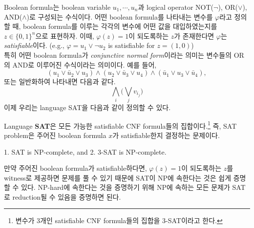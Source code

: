 Boolean formula는 boolean variable $u_1, \cdots, u_n$과 logical operator NOT($\neg$), OR($\vee$), AND($\wedge$)로 구성되는 수식이다. 어떤 boolean formula를 나타내는 변수를 $\varphi$라고 정의할 때, boolean formula를 이루는 각각의 변수에 어떤 값을 대입하였는지를 $z \in \{0, 1\}^n$으로 표현하자. 이때, $\varphi(z) = 1$이 되도록하는 $z$가 존재한다면 $\varphi$는 \textit{satisfiable}이다. (e.g., $\varphi = u_1 \vee \neg u_2$ is satisfiable for $z = (1, 0)$)
\\특히 어떤 boolean formula가 \textit{conjunctive normal form}이라는 의미는 변수들의 OR의 AND로 이루어진 수식이라는 의미이다. 예를 들어,
\begin{equation*}
    \left(u_1 \vee \bar{u}_2 \vee u_3\right) \wedge\left(u_2 \vee \bar{u}_3 \vee u_4\right) \wedge\left(\bar{u}_1 \vee u_3 \vee \bar{u}_4\right),
\end{equation*}
또는 일반화하여 나타내면 다음과 같다.
\begin{equation*}
    \bigwedge_i\Big(\bigvee_j v_{i_j}\Big)
\end{equation*}
이제 우리는 language SAT을 다음과 같이 정의할 수 있다.
\begin{definition}\label{def:SAT}
    Language \textbf{SAT}은 모든 가능한 satisfiable CNF formula들의 집합이다.\footnote{변수가 3개인 satisfiable CNF formula들의 집합을 3-SAT이라고 한다.} 즉, SAT problem은 주어진 boolean formula $x$가 satisfiable한지 결정하는 문제이다. 
\end{definition}

\begin{theorem}\label{thm:Cook-Levin}
    1. SAT is NP-complete, and 2. 3-SAT is NP-complete.
\end{theorem}
만약 주어진 boolean formula가 satisfiable하다면, $\varphi(z) = 1$이 되도록하는 $z$를 witness로 제공하면 문제를 풀 수 있기 때문에 SAT이 NP에 속한다는 것은 쉽게 증명할 수 있다. NP-hard에 속한다는 것을 증명하기 위해 NP에 속하는 모든 문제가 SAT로 reduction될 수 있음을 증명하면 된다.

